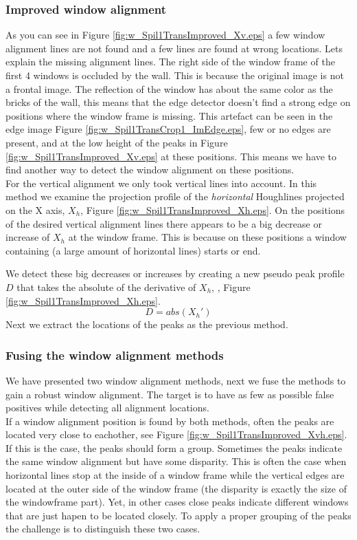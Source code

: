 \subsubsection{Improved window alignment}
As you can see in Figure \ref{fig:w_Spil1TransImproved_Xv.eps}
a few window alignment lines are not found and a few lines are found at wrong locations.
Lets explain the missing alignment lines.
The right side of the window frame of the first 4 windows is occluded by the
wall. This is because the original image is not a frontal image.
The reflection of the window has about the same color as the bricks of
the wall, this means that the edge detector
doesn't find a strong edge on positions where the window frame is missing.
This artefact can be seen in the edge image Figure \ref{fig:w_Spil1TransCrop1_ImEdge.eps}, few or no edges are present, and
at the low height of the peaks in Figure \ref{fig:w_Spil1TransImproved_Xv.eps} at these positions.
This means we have to find another way to detect the window alignment on these positions.\\

For the vertical alignment we only took vertical lines into account.
In this method we examine the projection profile of the \emph{horizontal} Houghlines
projected on the X axis, $X_h$, Figure \ref{fig:w_Spil1TransImproved_Xh.eps}.
On the positions of the desired vertical alignment lines there appears to be a 
big decrease or increase of $X_h$ at the window frame. This is because on these
positions a window containing (a large amount of horizontal lines) starts or end.

We detect these big decreases or increases by creating a new pseudo peak profile
$D$ that takes the absolute of the derivative of $X_h$, , Figure \ref{fig:w_Spil1TransImproved_Xh.eps}.
\[D = abs( X_{h}')\]
Next we extract the locations of the peaks as the previous method.

\subsubsection{Fusing the window alignment methods}
We have presented two window alignment methods, next we fuse the methods to
gain a robust window alignment.
The target is to have as few as possible false positives while detecting all alignment locations.\\

If a window alignment position is found by both methods, often the peaks are
located very close to eachother, see Figure
\ref{fig:w_Spil1TransImproved_Xvh.eps}.  If this is the case, the peaks should
form a group.  Sometimes the peaks indicate the same window alignment but have
some disparity.  This is often the case when horizontal lines stop at the inside
of a window frame while the vertical edges are located at the outer side of the
window frame (the disparity is exactly the size of the windowframe part).  Yet,
in other cases close peaks indicate different windows that are just hapen to be
located closely.  To apply a proper grouping of the peaks the challenge is to
distinguish these two cases.

